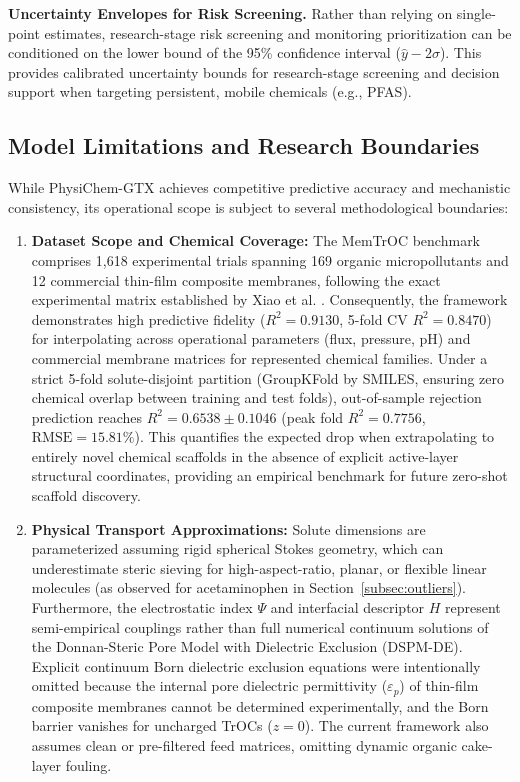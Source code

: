 \documentclass[10pt,twocolumn]{article}
\newcommand{\rsq}{R^{2}}
\begin{document}
\textbf{Uncertainty Envelopes for Risk Screening.} Rather than relying on single-point estimates, research-stage risk screening and monitoring prioritization can be conditioned on the lower bound of the 95\% confidence interval ($\hat{y} - 2\sigma$). This provides calibrated uncertainty bounds for research-stage screening and decision support when targeting persistent, mobile chemicals (e.g., PFAS).

\subsection{Model Limitations and Research Boundaries}
While PhysiChem-GTX achieves competitive predictive accuracy and mechanistic consistency, its operational scope is subject to several methodological boundaries:
\begin{enumerate}[leftmargin=1.3em,itemsep=2pt,topsep=2pt]
\item \textbf{Dataset Scope and Chemical Coverage:} The MemTrOC benchmark comprises 1,618 experimental trials spanning 169 organic micropollutants and 12 commercial thin-film composite membranes, following the exact experimental matrix established by Xiao et al. \cite{xiao2026}. Consequently, the framework demonstrates high predictive fidelity ($\rsq = 0.9130$, 5-fold CV $\rsq = 0.8470$) for interpolating across operational parameters (flux, pressure, pH) and commercial membrane matrices for represented chemical families. Under a strict 5-fold solute-disjoint partition (GroupKFold by SMILES, ensuring zero chemical overlap between training and test folds), out-of-sample rejection prediction reaches $\rsq = 0.6538 \pm 0.1046$ (peak fold $\rsq = 0.7756$, $\mathrm{RMSE} = 15.81\%$). This quantifies the expected drop when extrapolating to entirely novel chemical scaffolds in the absence of explicit active-layer structural coordinates, providing an empirical benchmark for future zero-shot scaffold discovery.
\item \textbf{Physical Transport Approximations:} Solute dimensions are parameterized assuming rigid spherical Stokes geometry, which can underestimate steric sieving for high-aspect-ratio, planar, or flexible linear molecules (as observed for acetaminophen in Section~\ref{subsec:outliers}). Furthermore, the electrostatic index $\Psi$ and interfacial descriptor $H$ represent semi-empirical couplings rather than full numerical continuum solutions of the Donnan-Steric Pore Model with Dielectric Exclusion (DSPM-DE). Explicit continuum Born dielectric exclusion equations were intentionally omitted because the internal pore dielectric permittivity ($\varepsilon_p$) of thin-film composite membranes cannot be determined experimentally, and the Born barrier vanishes for uncharged TrOCs ($z=0$). The current framework also assumes clean or pre-filtered feed matrices, omitting dynamic organic cake-layer fouling.

\end{enumerate}
\end{document}
